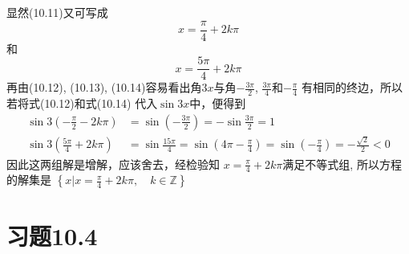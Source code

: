 \begin{solution}
显然(10.11)又可写成
\begin{equation}
  x=\frac{\pi}{4}+2k\pi
\end{equation}
和
\begin{equation}
  x=\frac{5\pi}{4}+2k\pi
\end{equation}
再由(10.12), (10.13), (10.14)容易看出角$3x$与角$-\frac{3\pi}{2}$, $\frac{3\pi}{4}$和$-\frac{\pi}{4}$
有相同的终边，所以若将式(10.12)和式(10.14)
代入$\sin3x$中，便得到
\[\begin{split}
  \sin 3\left(-\frac{\pi}{2}-2k\pi\right)&=\sin\left(-\frac{3\pi}{2}\right)=-\sin\frac{3\pi}{2}=1\\
  \sin 3\left(\frac{5\pi}{4}+2k\pi\right)&=\sin\frac{15\pi}{4}=\sin\left(4\pi-\frac{\pi}{4}\right)=\sin\left(-\frac{\pi}{4}\right)=-\frac{\sqrt{2}}{2}<0
\end{split}\]
因此这两组解是增解，应该舍去，经检验知
$x=\frac{\pi}{4}+2k\pi$满足不等式组, 
所以方程的解集是
$\left\{x\Big|x=\frac{\pi}{4}+2k\pi,\quad k\in\mathbb{Z}\right\}$








\end{solution}

\section*{习题10.4}


